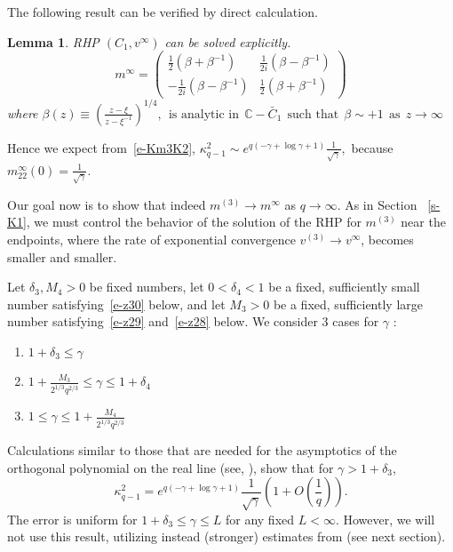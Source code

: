 \documentclass{amsart}
\newtheorem{lem}[thm]{Lemma}
\theoremstyle{definition}
\theoremstyle{remark}
\numberwithin{equation}{section}
\newcommand{\C}{\mathbb C}
\begin{document}
The following result can be verified by direct calculation.
\begin{lem}\label{lem-minfty}
RHP $(C_1, v^\infty)$ can be solved explicitly.
\begin{equation}
m^\infty = \begin{pmatrix} \frac12(\beta+\beta^{-1})& \frac1{2i}(\beta-\beta^{-1})\\
                           -\frac1{2i}(\beta-\beta^{-1})& \frac12(\beta+\beta^{-1}) \end{pmatrix}
\end{equation}
where $\beta(z)\equiv (\frac{z-\xi}{z-\xi^{-1}})^{1/4}, \ \ 
\text{is analytic in} \ \ \C-\bar{C}_1 \ \ \text{such that} \ \ 
\beta\sim +1 \ \ \text{as} \ \ z\rightarrow \infty$
\end{lem}
Hence we expect from~\eqref{e-Km3K2}, 
$\kappa^2_{q-1}\sim e^{q(-\gamma+\log \gamma+1)}\frac1{\sqrt{\gamma}},$ 
because $m^\infty_{22}(0)=\frac1{\sqrt{\gamma}}$.

Our goal now is to show that indeed $m^{(3)}\to m^{\infty}$ 
as $q\to\infty$. As in Section ~\ref{s-K1}, we must control 
the behavior of the solution of the RHP for $m^{(3)}$ near the 
endpoints, where the rate of exponential convergence 
$v^{(3)}\to v^{\infty}$, becomes smaller and smaller.


\bigskip
Let $\delta_3, M_4>0$ be fixed numbers, let $0< \delta_4<1$ 
be a fixed, sufficiently small number satisfying~\eqref{e-z30} below, 
and let $M_3 >0$ be a fixed, sufficiently large number 
satisfying~\eqref{e-z29} and~\eqref{e-z28} below.
We consider 3 cases for $\gamma$ : 
\begin{enumerate}
    \item $1+\delta_3 \le \gamma$
    \item $1+\frac{M_3}{2^{1/3}q^{2/3}} \le \gamma \le 1+\delta_4$
    \item $1\le \gamma \le 1+\frac{M_4}{2^{1/3}q^{2/3}}$
\end{enumerate}

\bigskip
Calculations similar to those that are needed for the asymptotics 
of the orthogonal polynomial on the real line (see, \cite{DKMVZ}), 
show that for $\gamma>1+\delta_3$,
\begin{equation}\label{8.1}
  \kappa^2_{q-1}= e^{q(-\gamma+\log \gamma+1)}\frac1{\sqrt{\gamma}}(1+O(\frac1{q})).
\end{equation}
The error is uniform for $1+\delta_3 \le \gamma \le L$ for any fixed $L<\infty$.
However, we will not use this result, utilizing instead (stronger) estimates 
from \cite{Johan} (see next section).
\end{document}

